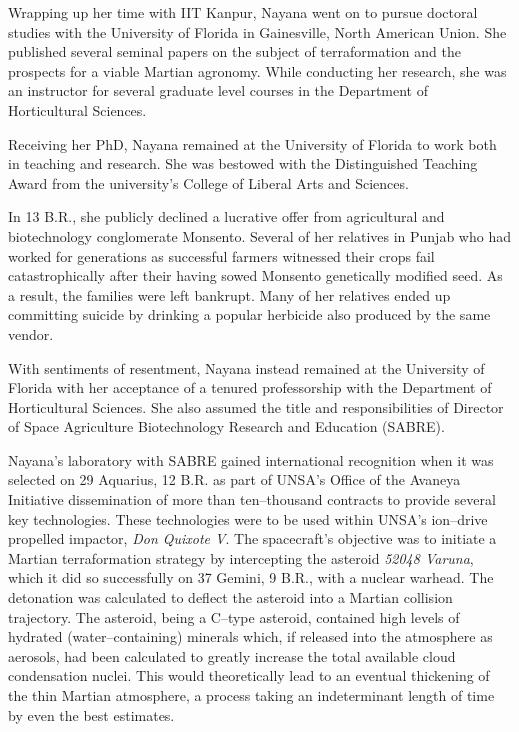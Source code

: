 Wrapping up her time with IIT Kanpur, Nayana went on to pursue doctoral studies with the University of Florida in Gainesville, North American Union. She published several seminal papers on the subject of terraformation and the prospects for a viable Martian agronomy. While conducting her research, she was an instructor for several graduate level courses in the Department of Horticultural Sciences.

Receiving her PhD, Nayana remained at the University of Florida to work both in teaching and research. She was bestowed with the Distinguished Teaching Award from the university's College of Liberal Arts and Sciences. 

In 13 B.R., she publicly declined a lucrative offer from agricultural and biotechnology conglomerate Monsento. Several of her relatives in Punjab who had worked for generations as successful farmers witnessed their crops fail catastrophically after their having sowed Monsento genetically modified seed. As a result, the families were left bankrupt. Many of her relatives ended up committing suicide by drinking a popular herbicide also produced by the same vendor. 

With sentiments of resentment, Nayana instead remained at the University of Florida with her acceptance of a tenured professorship with the Department of Horticultural Sciences. She also assumed the title and responsibilities of Director of Space Agriculture Biotechnology Research and Education (SABRE).

Nayana's laboratory with SABRE gained international recognition when it was selected on 29 Aquarius, 12 B.R. as part of UNSA's Office of the Avaneya Initiative dissemination of more than ten--thousand contracts to provide several key technologies. These technologies were to be used within UNSA's ion--drive propelled impactor, {\it Don Quixote V}. The spacecraft's objective was to initiate a Martian terraformation strategy by intercepting the asteroid {\it 52048 Varuna}, which it did so successfully on 37 Gemini, 9 B.R., with a nuclear warhead. The detonation was calculated to deflect the asteroid into a Martian collision trajectory. The asteroid, being a C--type asteroid, contained high levels of hydrated (water--containing) minerals which, if released into the atmosphere as aerosols, had been calculated to greatly increase the total available cloud condensation nuclei. This would theoretically lead to an eventual thickening of the thin Martian atmosphere, a process taking an indeterminant length of time by even the best estimates.

